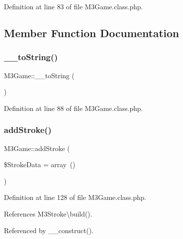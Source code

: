 Definition at line 83 of file M3\+Game.\+class.\+php.



\subsection{Member Function Documentation}
\mbox{\label{class_m3_game_a2c801e9cf5f799663c8713551e9e3eca}} 
\subsubsection{\texorpdfstring{\+\_\+\+\_\+to\+String()}{\_\_toString()}}
{\footnotesize\ttfamily M3\+Game\+::\+\_\+\+\_\+to\+String (\begin{DoxyParamCaption}{ }\end{DoxyParamCaption})}



Definition at line 88 of file M3\+Game.\+class.\+php.

\mbox{\label{class_m3_game_a67cf9e1f6628972901cfd6667dd2d453}} 
\subsubsection{\texorpdfstring{add\+Stroke()}{addStroke()}}
{\footnotesize\ttfamily M3\+Game\+::add\+Stroke (\begin{DoxyParamCaption}\item[{}]{\$\+Stroke\+Data = {\ttfamily array~()} }\end{DoxyParamCaption})\hspace{0.3cm}{\ttfamily [protected]}}



Definition at line 128 of file M3\+Game.\+class.\+php.



References M3\+Stroke\textbackslash{}build().



Referenced by \+\_\+\+\_\+construct().


